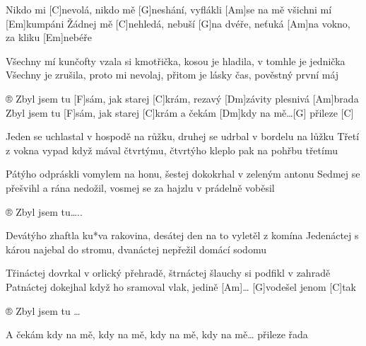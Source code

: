 
Nikdo mi [C]nevolá, nikdo mě [G]neshání, vyflákli [Am]se na mě všichni mí [Em]kumpáni
Žádnej mě [C]nehledá, nebuší [G]na dvéře, neťuká [Am]na vokno, za kliku [Em]nebéře

Všechny mí kunčofty vzala si kmotřička, kosou je hladila, v tomhle je jednička
Všechny je zrušila, proto mi nevolaj, přitom je lásky čas, pověstný první máj

® Zbyl jsem tu [F]sám, jak starej [C]krám, rezavý [Dm]závity plesnivá [Am]brada
Zbyl jsem tu [F]sám, jak starej [C]krám a čekám [Dm]kdy na mě…[G] přileze [C]

Jeden se uchlastal v hospodě na růžku, druhej se udrbal v bordelu na lůžku
Třetí z vokna vypad když mával čtvrtýmu, čtvrtýho kleplo pak na pohřbu třetímu

Pátýho odpráskli vomylem na honu, šestej dokokrhal v zeleným antonu
Sedmej se přešvihl a rána nedožil, vosmej se za hajzlu v prádelně voběsil

® Zbyl jsem tu…..

Devátýho zhaftla ku*va rakovina, desátej den na to vyletěl z komína
Jedenáctej s károu najebal do stromu, dvanáctej nepřežil domácí sodomu

Třináctej dovrkal v orlický přehradě, štrnáctej šlauchy si podfikl v zahradě
Patnáctej dokejhal když ho sramoval vlak, jedině [Am]… [G]vodešel jenom [C]tak

® Zbyl jsem tu …

A čekám kdy na mě, kdy na mě, kdy na mě, kdy na mě… přileze řada
